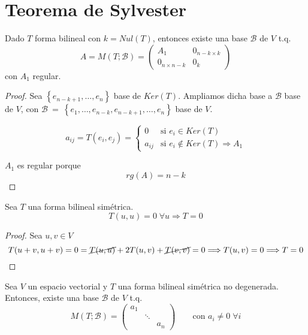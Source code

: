 \section{Teorema de Sylvester}

\begin{lema}
    Dado $T$ forma bilineal con $k=Nul(T)$, entonces existe una base $\mathcal{B}$ de $V$ t.q.
    \begin{equation*}
        A = M(T;\mathcal{B}) = \left( \begin{array}{c|c}
            A_1 & 0_{n-k\times k} \\ \hline
            0_{n\times n-k} & 0_k
        \end{array}\right)
    \end{equation*}
    con $A_1$ regular.
\end{lema}

\begin{proof}
    Sea $\left\{e_{n-k+1}, \dots, e_n \right\}$ base de $Ker(T)$. Ampliamos dicha base a $\mathcal{B}$ base de $V$, con $\mathcal{B}~=~\left\{e_1, \dots, e_{n-k}, e_{n-k+1}, \dots, e_n \right\}$ base de $V$.

    \begin{equation*}
        a_{ij} = T(e_i, e_j) = \left\{ \begin{array}{cl}
            0 & \text{si } e_i \in Ker(T) \\
            a_{ij}  & \text{si } e_i \notin Ker(T) \Longrightarrow A_1
        \end{array}\right.
    \end{equation*}

    $A_1$ es regular porque
    $$rg(A) = n-k$$
\end{proof}

\begin{prop}
    Sea $T$ una forma bilineal simétrica.
    $$T(u,u) = 0 \;\forall u \Longrightarrow T=0$$
\end{prop}
\begin{proof}
    Sea $u,v \in V$
    \begin{equation*}
        T(u+v, u+v) = 0 = \cancel{T(u,u)} + 2T(u,v) + \cancel{T(v,v)} = 0 \Longrightarrow T(u,v)=0 \Longrightarrow T=0
    \end{equation*}
\end{proof}

\begin{teo}
    Sea $V$ un espacio vectorial y $T$ una forma bilineal simétrica no degenerada. Entonces, existe una base $\mathcal{B}$ de $V$ t.q.
    \begin{equation*}
        M(T;\mathcal{B}) = \left( \begin{array}{ccc}
            a_1 & & \\
             & \ddots &\\
             && a_n
        \end{array}\right) \qquad \text{con } a_i \neq 0\; \forall i
    \end{equation*}
\end{teo}

